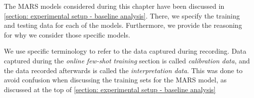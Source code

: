 The MARS models considered during this chapter have been discussed in \cref{section: experimental setup - baseline analysis}.
There, we specify the training and testing data for each of the models.
Furthermore, we provide the reasoning for why we consider those specific models.

We use specific terminology to refer to the data captured during recording.
Data captured during the \textit{online few-shot training} section is called \textit{calibration data}, and the data recorded afterwards is called the \textit{interpretation data}. 
This was done to avoid confusion when discussing the training sets for the MARS model, as discussed at the top of \cref{section: experimental setup - baseline analysis}




